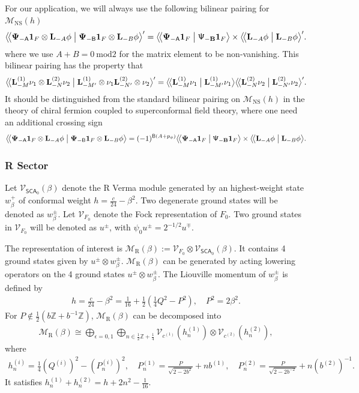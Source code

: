 \documentclass[12pt]{article}
\newcommand{\ie}{\begin{equation}\begin{aligned}}
\newcommand{\fe}{\end{aligned}\end{equation}}
\numberwithin{equation}{section}
\newcommand{\bpzbraket}[2]{%
  \bigl\langle\!\bigl\langle #1 \bigm| #2 \bigr\rangle%
}
\begin{document}
For our application, we will always use the following bilinear pairing for $\mathcal{M}_{\mathrm{NS}}(h)$
\ie
\bpzbraket{\mathbf{\Psi}_{-\mathsf{A}}\mathbf{1}_F \otimes \mathbf{L}_{-A} \phi }{\mathbf{\Psi}_{-\mathsf{B}}\mathbf{1}_F \otimes \mathbf{L}_{-B} \phi}^{\prime} =\bpzbraket{\mathbf{\Psi}_{-\mathsf{A}}\mathbf{1}_F}{\mathsf{\Psi}_{-\mathbf{B}}\mathbf{1}_F} \times \bpzbraket{\mathbf{L}_{-A} \phi }{\mathbf{L}_{-B} \phi}^{\prime}.
\fe
where we use $A+B = 0~\text{mod}2$ for the matrix element to be non-vanishing. This bilinear pairing has the property that 
\ie
\bpzbraket{\mathbf{L}^{(1)}_{-M} \nu_1\otimes \mathbf{L}^{(2)}_{-N}  \nu_2} { \mathbf{L}^{(1)}_{-M'} \otimes \nu_1\mathbf{L}^{(2)}_{-N'} \otimes \nu_2}^{\prime} = \bpzbraket{\mathbf{L}^{(1)}_{-M}  \nu_1} {\mathbf{L}^{(1)}_{-M'} \nu_1}\bpzbraket{\mathbf{L}^{(2)}_{-N}  \nu_2} {\mathbf{L}^{(2)}_{-N'} \nu_2}^{\prime}.
\fe
It should be distinguished from the standard bilinear pairing on $\mathcal{M}_{\mathrm{NS}}(h)$ in the theory of chiral fermion coupled to superconformal field theory, where one need an additional crossing sign
\ie
\bpzbraket{\mathbf{\Psi}_{-\mathsf{A}}\mathbf{1}_F \otimes \mathbf{L}_{-A} \phi }{\mathbf{\Psi}_{-\mathsf{B}}\mathbf{1}_F \otimes \mathbf{L}_{-B} \phi} =(-1)^{\mathsf{B}(A+p_{\phi} )}\bpzbraket{\mathbf{\Psi}_{-\mathsf{A}}\mathbf{1}_F}{\mathsf{\Psi}_{-\mathbf{B}}\mathbf{1}_F} \times \bpzbraket{\mathbf{L}_{-A} \phi }{\mathbf{L}_{-B} \phi}.
\fe


\subsubsection*{R Sector}
Let $\mathcal{V}_{\mathsf{SCA}_{0}}(\beta)$ denote the R Verma
module generated by an highest-weight state $w^{+}_{\beta}$ of conformal weight $h = \frac{c}{24}-\beta^2$. Two degenerate ground states will be denoted as $w^{\pm}_{\beta}$. Let $\mathcal{V}_{F_0}$ denote the Fock representation of $F_{0}$. Two ground states in $\mathcal{V}_{F_0}$ will be denoted as $u^\pm$, with $\psi_0 u^\pm = 2^{-1/2}u^\mp$.

The representation of interest is $\mathcal{M}_{\mathrm{R}}(\beta):= \mathcal{V}_{F_{0}}\otimes  \mathcal{V}_{\mathsf{SCA}_{0}}(\beta)$. It contains 4 ground states given by $u^\pm \otimes w^\pm_\beta$. $\mathcal{M}_{\mathrm{R}}(\beta)$ can be generated by acting lowering operators on the 4 ground states $u^\pm \otimes w_\beta^\pm$. The Liouville momentum of $w_\beta^\pm$ is defined by
\ie
h = \frac{c}{24}-\beta^2 = \frac{1}{16} + \frac{1}{2}\left(\frac{1}{4}Q^2-P^2\right),\quad P^2 = 2\beta^2.
\fe
For $P\notin \frac{1}{2}(b\mathbb{Z}+b^{-1}\mathbb{Z})$, $\mathcal{M}_{\mathrm{R}}(\beta)$ can be decomposed into \cite{1608.02568}
\ie\label{Rbranching}
\mathcal{M}_{\mathrm{R}}(\beta) \cong \bigoplus_{\epsilon=0,1} \bigoplus_{n \in \frac{1}{2} \mathbb{Z}+\frac{1}{4}} \mathcal{V}_{c^{(1)}}(h_{n}^{(1)}) \otimes \mathcal{V}_{c^{(2)}}(h_{n}^{(2)}),
\fe
where
\ie
h^{(i)}_n = \frac{1}{4}(Q^{(i)})^2-(P_{n}^{(i)})^2,\quad P_n^{(1)}=\frac{P}{\sqrt{2-2 b^2}}+n b^{(1)},\quad P_n^{(2)}=\frac{P}{\sqrt{2-2 b^{-2}}}+n(b^{(2)})^{-1}.
\fe
It satisfies $h_n^{(1)}+h_n^{(2)} = h +2n^2 -\frac{1}{16}$.
\end{document}
